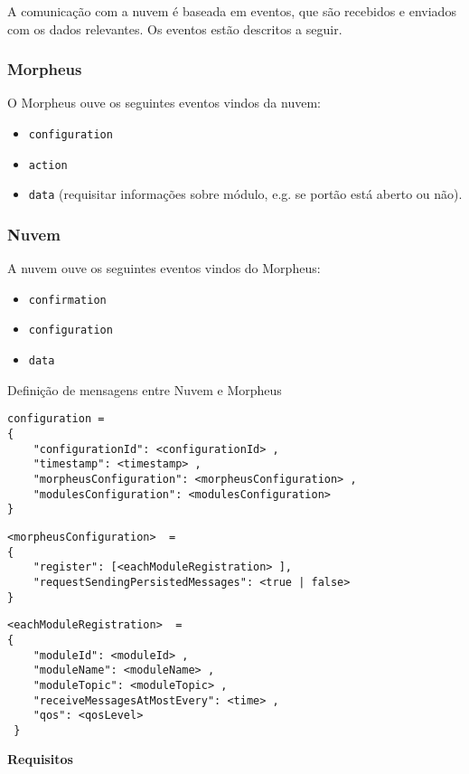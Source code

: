 A comunicação com a nuvem é baseada em eventos, que são recebidos e enviados com os dados relevantes. Os eventos estão descritos a seguir.

\subsubsection{Morpheus}
O Morpheus ouve os seguintes eventos vindos da nuvem:

\begin{itemize}
\item \texttt{configuration}
\item \texttt{action}
\item \texttt{data} (requisitar informações sobre módulo, e.g. se portão está aberto ou não).
\end{itemize}

\subsubsection{Nuvem}
A nuvem ouve os seguintes eventos vindos do Morpheus:

\begin{itemize}
\item \texttt{confirmation}
\item \texttt{configuration}
\item \texttt{data}
\end{itemize}

Definição de mensagens entre Nuvem e Morpheus
\begin{lstlisting}
configuration =
{
    "configurationId": <configurationId> ,
    "timestamp": <timestamp> ,
    "morpheusConfiguration": <morpheusConfiguration> ,
    "modulesConfiguration": <modulesConfiguration>
}
\end{lstlisting}

\begin{lstlisting}
<morpheusConfiguration>  =
{
    "register": [<eachModuleRegistration> ],
    "requestSendingPersistedMessages": <true | false>
}
\end{lstlisting}

\begin{lstlisting}
<eachModuleRegistration>  =
{
    "moduleId": <moduleId> ,
    "moduleName": <moduleName> ,
    "moduleTopic": <moduleTopic> ,
    "receiveMessagesAtMostEvery": <time> ,
    "qos": <qosLevel>
 }
 \end{lstlisting}


\textbf{Requisitos}

